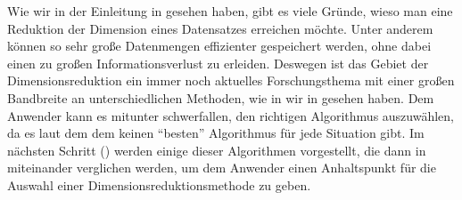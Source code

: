 Wie wir in der Einleitung in  gesehen haben, gibt es viele Gründe, wieso man
eine Reduktion der Dimension eines Datensatzes erreichen möchte. Unter anderem können so sehr große
Datenmengen effizienter gespeichert werden, ohne dabei einen zu großen Informationsverlust zu
erleiden. Deswegen ist das Gebiet der Dimensionsreduktion ein immer noch aktuelles Forschungsthema
mit einer großen Bandbreite an unterschiedlichen Methoden, wie in wir in
 gesehen haben. Dem Anwender kann es mitunter schwerfallen,
den richtigen Algorithmus auszuwählen, da es laut dem dem  \parencite{Wolpert.1997} keinen \enquote{besten} Algorithmus für jede Situation gibt. Im nächsten
Schritt () werden einige dieser Algorithmen vorgestellt, die dann in
 miteinander verglichen werden, um dem Anwender einen Anhaltspunkt für die
Auswahl einer Dimensionsreduktionsmethode zu geben.
